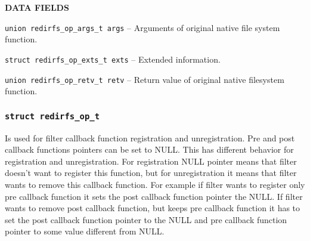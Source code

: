 \begin{list}{}{}
	\item \textbf{DATA FIELDS}
		\begin{list}{}{}
			\item \texttt{union redirfs\_op\_args\_t args} -- Arguments of
				original native file system function.
			\item \texttt{struct redirfs\_op\_exts\_t exts} -- Extended
				information.
			\item \texttt{union redirfs\_op\_retv\_t retv} -- Return value
				of original native filesystem function.
		\end{list}
\end{list}

\subsubsection{\texttt{struct redirfs\_op\_t}}
Is used for filter callback function registration and unregistration. Pre and post
callback functions pointers can be set to NULL. This has different behavior for
registration and unregistration. For registration NULL pointer means that filter
doesn't want to register this function, but for unregistration it means that filter
wants to remove this callback function. For example if filter wants to register only
pre callback function it sets the post callback function pointer the NULL. If
filter wants to remove post callback function, but keeps pre callback function it
has to set the post callback function pointer to the NULL and pre callback
function pointer to some value different from NULL. 

